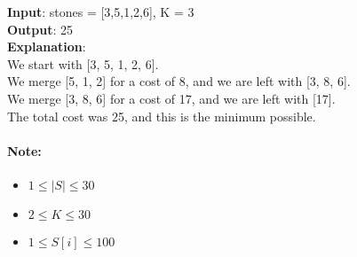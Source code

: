 \begin{flushleft}
\textbf{Input}: stones = [3,5,1,2,6], K = 3
\\
\textbf{Output}: 25
\\
\textbf{Explanation}: 
\\
We start with [3, 5, 1, 2, 6].
\\
We merge [5, 1, 2] for a cost of 8, and we are left with [3, 8, 6].
\\
We merge [3, 8, 6] for a cost of 17, and we are left with [17].
\\
The total cost was 25, and this is the minimum possible.
\end{flushleft}
 
\paragraph{Note:
}
\begin{itemize}
\item $1 \leq |S| \leq 30$
\item $2 \leq K \leq 30$
\item $1 \leq S[i] \leq 100$
\end{itemize}
